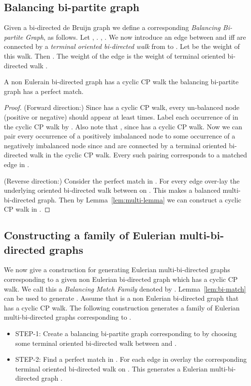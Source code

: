 \documentclass[runningheads]{llncs}
\begin{document}
\subsection{Balancing bi-partite graph}
\label{sec:bal-bi-graph}
Given a bi-directed de Bruijn graph  we define a corresponding {\em Balancing Bi-partite Graph},
 as follows. Let , 
. 
, 
. We now introduce an 
edge between  and  iff  are connected by a {\em terminal oriented
bi-directed walk} from  to . Let  be the weight of
this walk. Then . The weight
of the edge  is the weight of terminal oriented bi-directed walk .

\begin{lemma}
\label{lem:bi-match}
A non Eulerain bi-directed graph  has a cyclic CP walk  the balancing bi-partite graph 
 has a perfect match.
\end{lemma}
\begin{proof}
(Forward direction:) Since  has a cyclic CP walk, every un-balanced node (positive or negative) 
should appear at least  times. Label each occurrence of  in the cyclic CP walk by . Also note that , 
since  has a cyclic CP walk. Now we can pair every  occurrence of a positively imbalanced node  to some
 occurrence of a negatively imbalanced node  since  and  are connected by a terminal oriented bi-directed
walk in the cyclic CP walk. Every such pairing corresponds to a matched edge in .

\vspace{0.1in}

\noindent(Reverse direction:) Consider the perfect match  in . For every edge 
over-lay the underlying oriented bi-directed walk between  on . This makes  a balanced
multi-bi-directed graph. Then by Lemma~\ref{lem:multi-lemma} we can construct a cyclic CP walk in . 
\end{proof}

\subsection{Constructing a family of Eulerian multi-bi-directed graphs}
We now give a construction for generating Eulerian multi-bi-directed graphs corresponding to a given non 
Eulerian bi-directed graph which has a cyclic CP walk. We call this a {\em Balancing Match Family} denoted
by . Lemma~\ref{lem:bi-match} can be used to generate . Assume that  is a non Eulerian bi-directed graph that has a cyclic CP walk. The following construction generates a
family of Eulerian multi-bi-directed graphs corresponding to .
\begin{itemize}
\item {\sf STEP-1:} Create a balancing bi-partite graph  corresponding to  by choosing 
some terminal oriented bi-directed walk between  and .
\item {\sf STEP-2:} Find a perfect match  in . For each edge in  overlay the 
corresponding terminal oriented bi-directed walk on . This generates a Eulerian multi-bi-directed
graph .
\end{itemize}
\end{document}
